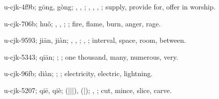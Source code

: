 \begin{multicols}{2}
{\cjkgGlue{}u-cjk-4f9b; gōng, gòng; \cjkgGlue{}\cjkgGlue{}\cjkgGlue{}, \cjkgGlue{}, \cjkgGlue{}; \cjkgGlue{}, \cjkgGlue{}, \cjkgGlue{}, \cjkgGlue{}; supply, provide for, offer in worship.

\cjkgGlue{}u-cjk-706b; huǒ; \cjkgGlue{}, \cjkgGlue{}, \cjkgGlue{}; \cjkgGlue{}; fire, flame, burn, anger, rage.

\cjkgGlue{}u-cjk-9593; jiān, jiàn; \cjkgGlue{}, \cjkgGlue{}, \cjkgGlue{}; \cjkgGlue{}, \cjkgGlue{}; interval, space, room, between.

\cjkgGlue{}u-cjk-5343; qiān; \cjkgGlue{}; \cjkgGlue{}; one thousand, many, numerous, very.

\cjkgGlue{}u-cjk-96fb; diàn; \cjkgGlue{}; \cjkgGlue{}; electricity, electric, lightning.

\cjkgGlue{}u-cjk-5207; qiē, qiè; \cjkgGlue{}\cjkgGlue{}(\cjkgGlue{}|\cjkgGlue{}|\cjkgGlue{}|\cjkgGlue{}), \cjkgGlue{}\cjkgGlue{}(\cjkgGlue{}|\cjkgGlue{}); \cjkgGlue{}, \cjkgGlue{}; cut, mince, slice, carve.

}
\end{multicols}

